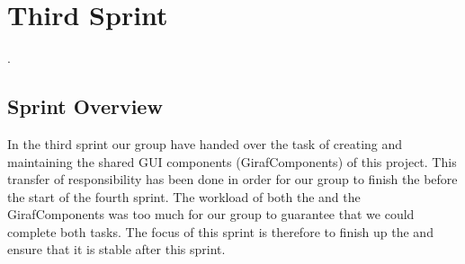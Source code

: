 \part{Third Sprint}
\label{par:third_sprint}

.

\chapter{Sprint Overview}
In the third sprint our group have handed over the task of creating and maintaining the shared GUI components (GirafComponents) of this project. This transfer of responsibility has been done in order for our group to finish the \ct before the start of the fourth sprint. The workload of both the \ct and the GirafComponents was too much for our group to guarantee that we could complete both tasks. The focus of this sprint is therefore to finish up the \ct and ensure that it is stable after this sprint.

